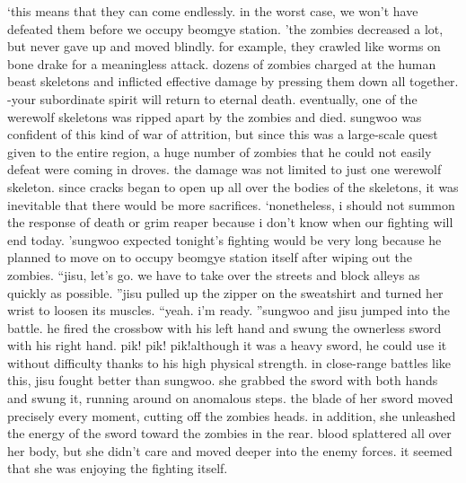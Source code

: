 ‘this means that they can come endlessly.
 in the worst case, we won’t have defeated them before we occupy beomgye station.
’the zombies decreased a lot, but never gave up and moved blindly.
for example, they crawled like worms on bone drake for a meaningless attack.
 dozens of zombies charged at the human beast skeletons and inflicted effective damage by pressing them down all together.
-your subordinate spirit will return to eternal death.
eventually, one of the werewolf skeletons was ripped apart by the zombies and died.
sungwoo was confident of this kind of war of attrition, but since this was a large-scale quest given to the entire region, a huge number of zombies that he could not easily defeat were coming in droves.
the damage was not limited to just one werewolf skeleton.
 since cracks began to open up all over the bodies of the skeletons, it was inevitable that there would be more sacrifices.
‘nonetheless, i should not summon the response of death or grim reaper because i don’t know when our fighting will end today.
’sungwoo expected tonight’s fighting would be very long because he planned to move on to occupy beomgye station itself after wiping out the zombies.
“jisu, let’s go.
 we have to take over the streets and block alleys as quickly as possible.
”jisu pulled up the zipper on the sweatshirt and turned her wrist to loosen its muscles.
“yeah.
 i’m ready.
”sungwoo and jisu jumped into the battle.
 he fired the crossbow with his left hand and swung the ownerless sword with his right hand.
pik! pik! pik!although it was a heavy sword, he could use it without difficulty thanks to his high physical strength.
in close-range battles like this, jisu fought better than sungwoo.
 she grabbed the sword with both hands and swung it, running around on anomalous steps.
the blade of her sword moved precisely every moment, cutting off the zombies heads.
 in addition, she unleashed the energy of the sword toward the zombies in the rear.
blood splattered all over her body, but she didn’t care and moved deeper into the enemy forces.
 it seemed that she was enjoying the fighting itself.


 